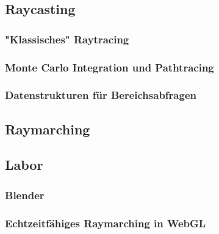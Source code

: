 \subsection{Raycasting}
\subsubsection{"Klassisches" Raytracing}
\subsubsection{Monte Carlo Integration und Pathtracing}
\subsubsection{Datenstrukturen für Bereichsabfragen}

\subsection{Raymarching}
\subsection{Labor}
\subsubsection{Blender}
\subsubsection{Echtzeitfähiges Raymarching in WebGL}
